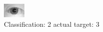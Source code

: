 \begin{figure}[h!]
\begin{center}
\includegraphics[width=0.60\columnwidth]{figures/ID1096_class_2_target_3.png}
\end{center}
\caption{ Classification: 2 actual target: 3}
\label{fig:ID1096_class_2_target_3}
\end{figure}
